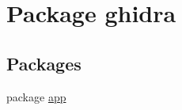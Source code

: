 \hypertarget{namespaceghidra}{}\section{Package ghidra}
\label{namespaceghidra}
\subsection*{Packages}
\begin{DoxyCompactItemize}
\item 
package \mbox{\hyperlink{namespaceghidra_1_1app}{app}}
\end{DoxyCompactItemize}
